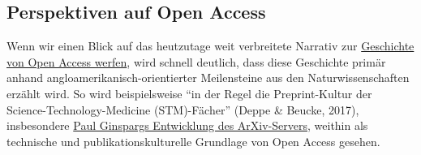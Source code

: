 \documentclass[a4paper,
fontsize=11pt,
oneside,
numbers=noperiodatend,
parskip=half-,
bibliography=totoc,
final
]{scrartcl}
\begin{document}
\hypertarget{perspektiven-auf-open-access}{%
\subsection{Perspektiven auf Open
Access}\label{perspektiven-auf-open-access}}

Wenn wir einen Blick auf das heutzutage weit verbreitete Narrativ zur
\href{https://open-access.network/informieren/open-access-grundlagen/geschichte-des-open-access}{Geschichte
von Open Access werfen}, wird schnell deutlich, dass diese Geschichte
primär anhand angloamerikanisch-orientierter Meilensteine aus den
Naturwissenschaften erzählt wird. So wird beispielsweise \enquote{in der
Regel die Preprint-Kultur der Science-Technology-Medicine (STM)-Fächer}
(Deppe \& Beucke, 2017), insbesondere
\href{https://open-access.network/informieren/open-access-grundlagen/geschichte-des-open-access}{Paul
Ginspargs Entwicklung des ArXiv-Servers}, weithin als technische und
publikationskulturelle Grundlage von Open Access gesehen.
\end{document}

